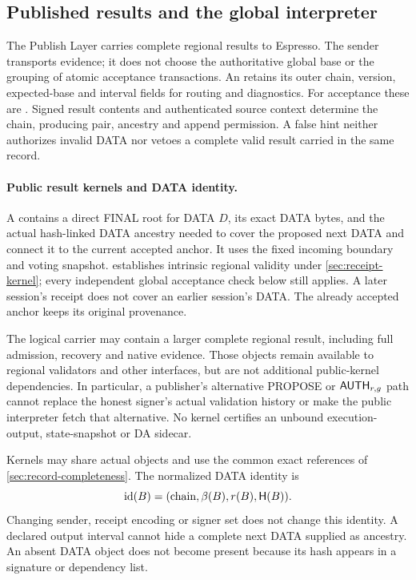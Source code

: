 \subsection{Published results and the global interpreter}
\label{sec:exports}
The Publish Layer carries complete regional results to Espresso.
The sender transports evidence; it does not choose the authoritative
global base or the grouping of atomic acceptance transactions.
An  retains its outer chain, version, expected-base and
interval fields for routing and diagnostics. For acceptance these are
. Signed result contents and authenticated source context
determine the chain, producing pair, ancestry and append permission.
A false hint neither authorizes invalid DATA nor vetoes a complete
valid result carried in the same record.



\paragraph{Public result kernels and DATA identity.}
A  contains a direct FINAL root for DATA
$D$, its exact DATA bytes, and the actual hash-linked DATA ancestry
needed to cover the proposed next DATA and connect it to the current
accepted anchor. It uses the fixed incoming boundary and voting snapshot.
 establishes intrinsic regional validity under
\cref{sec:receipt-kernel}; every independent global acceptance check below
still applies. A later session's receipt does not cover an earlier
session's DATA. The already accepted anchor keeps its original provenance.

The logical carrier may contain a larger complete regional result,
including full admission, recovery and native evidence. Those objects
remain available to regional validators and other interfaces, but are
not additional public-kernel dependencies. In particular, a publisher's
alternative PROPOSE or $\mathsf{AUTH}_{r,g}$ path cannot replace the honest
signer's actual validation history or make the public interpreter fetch
that alternative. No kernel certifies an unbound execution-output,
state-snapshot or DA sidecar.

Kernels may share actual objects and use the common exact references of
\cref{sec:record-completeness}. The normalized DATA identity is
\[
 \operatorname{id}(B)=(\text{chain},\beta(B),r(B),\mathsf H(B)).
\]
Changing sender, receipt encoding or signer set does not change this
identity. A declared output interval cannot hide a complete next DATA
supplied as ancestry. An absent DATA object does not become present
because its hash appears in a signature or dependency list.

